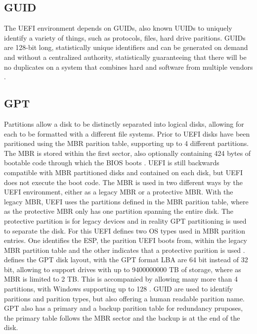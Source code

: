 \cite{beyond-bios}

\subsection{\acf{GUID}}

The \ac{UEFI} environment depends on \acp{GUID}, also known \acp{UUID} to uniquely identify a variety of things, such as protocols, files, hard drive paritions.
\acp{GUID} are 128-bit long, statistically unique identifiers and can be generated on demand and without a centralized authority, statistically guaranteeing that there will be no duplicates on a system that combines hard and software from multiple vendors \cite{rfc-4122}.

\subsection{\acf{GPT}}

Partitions allow a disk to be distinctly separated into logical disks, allowing for each to be formatted with a different file systems.
Prior to \ac{UEFI} disks have been paritioned using the \ac{MBR} parition table, supporting up to 4 different partitions.
The \ac{MBR} is stored within the first sector, also optionally containing 424 bytes of bootable code through which the \ac{BIOS} boots \cite[Section 13.3.1]{uefi-spec}.
\ac{UEFI} is still backwards compatible with \ac{MBR} partitioned disks and contained on each disk, but \ac{UEFI} does not execute the boot code.
The \ac{MBR} is used in two different ways by the \ac{UEFI} environment, either as a legacy \ac{MBR} or a protective \ac{MBR}.
With the legacy \ac{MBR}, \ac{UEFI} uses the partitions defined in the \ac{MBR} parition table, where as the protective \ac{MBR} only has one partition spanning the entire disk.
The protective partition is for legacy devices and in reality \ac{GPT} partitioning is used to separate the disk.
For this \ac{UEFI} defines two \ac{OS} types used in \ac{MBR} parition entries.
One identifies the \ac{ESP}, the parition \ac{UEFI} boots from, within the legacy \ac{MBR} partition table and the other indicates that a protective parition is used \cite[Section 5]{uefi-spec}.
\cite[Section 5]{uefi-spec} defines the \ac{GPT} disk layout, with the \ac{GPT} format \ac{LBA} are 64 bit instead of 32 bit, allowing to support drives with up to 9400000000 \ac{TB} of storage, where as \ac{MBR} is limited to 2 \ac{TB}.
This is accompanied by allowing many more than 4 partitions, with Windows supporting up to 128 \cite{microsoft-windows-and-gpt-faq}.
\ac{GUID} are used to identify paritions and parition types, but also offering a human readable parition name.
\ac{GPT} also has a primary and a backup parition table for redundancy pruposes, the primary table follows the \ac{MBR} sector and the backup is at the end of the disk.

